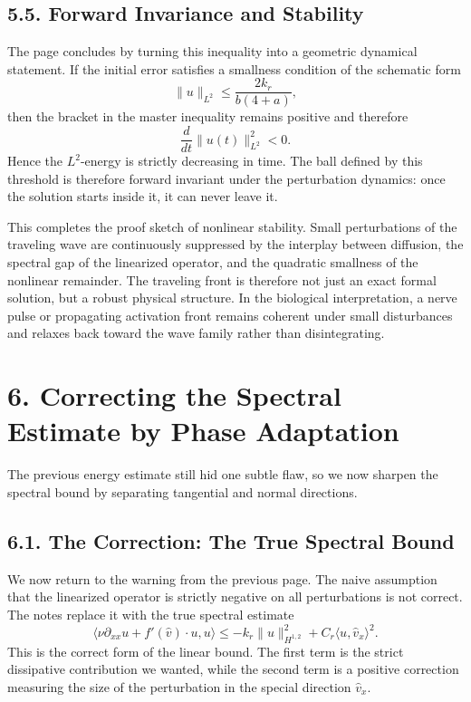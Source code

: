 \documentclass[11pt]{article}
\theoremstyle{definition}
\theoremstyle{remark}
\begin{document}
\subsection*{5.5. Forward Invariance and Stability}
The page concludes by turning this inequality into a geometric dynamical statement. If the initial error satisfies a smallness condition of the schematic form
\[
\|u\|_{L^2}\le \frac{2k_r}{b(4+a)},
\]
then the bracket in the master inequality remains positive and therefore
\[
\frac{d}{dt}\|u(t)\|_{L^2}^2<0.
\]
Hence the \(L^2\)-energy is strictly decreasing in time. The ball defined by this threshold is therefore forward invariant under the perturbation dynamics: once the solution starts inside it, it can never leave it.

This completes the proof sketch of nonlinear stability. Small perturbations of the traveling wave are continuously suppressed by the interplay between diffusion, the spectral gap of the linearized operator, and the quadratic smallness of the nonlinear remainder. The traveling front is therefore not just an exact formal solution, but a robust physical structure. In the biological interpretation, a nerve pulse or propagating activation front remains coherent under small disturbances and relaxes back toward the wave family rather than disintegrating.

\section*{6. Correcting the Spectral Estimate by Phase Adaptation}
The previous energy estimate still hid one subtle flaw, so we now sharpen the spectral bound by separating tangential and normal directions.

\subsection*{6.1. The Correction: The True Spectral Bound}
We now return to the warning from the previous page. The naive assumption that the linearized operator is strictly negative on all perturbations is not correct. The notes replace it with the true spectral estimate
\[
\langle \nu\partial_{xx}u+f'(\widehat v)\cdot u,u\rangle
\le -k_r\|u\|_{H^{1,2}}^2 + C_r\langle u,\widehat v_x\rangle^2.
\]
This is the correct form of the linear bound. The first term is the strict dissipative contribution we wanted, while the second term is a positive correction measuring the size of the perturbation in the special direction \(\widehat v_x\).
\end{document}
